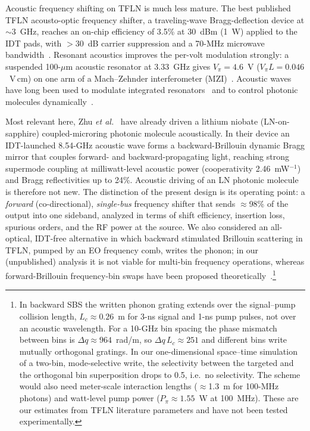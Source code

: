 \documentclass[aps,prapplied,reprint,superscriptaddress,amsmath,amssymb,floatfix]{revtex4-2}
\begin{document}
Acoustic frequency shifting on TFLN is much less mature. The best published TFLN acousto-optic frequency shifter, a traveling-wave Bragg-deflection device at $\sim$3~GHz, reaches an on-chip efficiency of 3.5\% at 30~dBm (1~W) applied to the IDT pads, with $>$30~dB carrier suppression and a 70-MHz microwave bandwidth~\cite{Shao2020}. Resonant acoustics improves the per-volt modulation strongly: a suspended 100-$\mu$m acoustic resonator at 3.33~GHz gives $V_\pi=4.6$~V ($V_\pi L=0.046$~V\,cm) on one arm of a Mach--Zehnder interferometer (MZI)~\cite{Shao2019}. Acoustic waves have long been used to modulate integrated resonators~\cite{Tadesse2014} and to control photonic molecules dynamically~\cite{Kapfinger2015}.

Most relevant here, Zhu \emph{et al.}~\cite{Zhu2025ao} have already driven a lithium niobate (LN-on-sapphire) coupled-microring photonic molecule acoustically. In their device an IDT-launched 8.54-GHz acoustic wave forms a backward-Brillouin dynamic Bragg mirror that couples forward- and backward-propagating light, reaching strong supermode coupling at milliwatt-level acoustic power (cooperativity 2.46~mW$^{-1}$) and Bragg reflectivities up to 24\%. Acoustic driving of an LN photonic molecule is therefore not new. The distinction of the present design is its operating point: a \emph{forward} (co-directional), \emph{single-bus} frequency shifter that sends $\approx$98\% of the output into one sideband, analyzed in terms of shift efficiency, insertion loss, spurious orders, and the RF power at the source. We also considered an all-optical, IDT-free alternative in which backward stimulated Brillouin scattering in TFLN, pumped by an EO frequency comb, writes the phonon; in our (unpublished) analysis it is not viable for multi-bin frequency operations, whereas forward-Brillouin frequency-bin swaps have been proposed theoretically~\cite{ShepherdBehunin2025}.\footnote{In backward SBS the written phonon grating extends over the signal--pump collision length, $L_c\approx0.26$~m for 3-ns signal and 1-ns pump pulses, not over an acoustic wavelength. For a 10-GHz bin spacing the phase mismatch between bins is $\Delta q\approx964$~rad/m, so $\Delta q\,L_c\approx251$ and different bins write mutually orthogonal gratings. In our one-dimensional space--time simulation of a two-bin, mode-selective write, the selectivity between the targeted and the orthogonal bin superposition drops to 0.5, i.e.\ no selectivity. The scheme would also need meter-scale interaction lengths ($\approx$1.3~m for 100-MHz photons) and watt-level pump power ($P_\pi\approx1.55$~W at 100~MHz). These are our estimates from TFLN literature parameters and have not been tested experimentally.}
\end{document}
